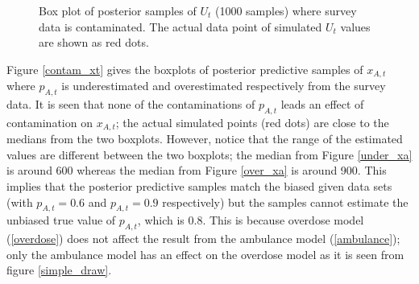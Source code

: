 \documentclass[12pt]{article}
\begin{document}
{\begin{figure}[htb]
	\centering
	\caption[Initial result: boxplot of posterior samples of $U_t$]{Box plot of posterior samples of $U_t$ (1000 samples) where survey data is contaminated.  The actual data point of simulated $U_t$ values are shown as red dots.}
	\label{contam_ut}
\end{figure}

Figure \ref{contam_xt}  gives the boxplots of posterior predictive samples of $x_{A,t}$ where $p_{A,t}$ is underestimated and overestimated respectively from the survey data. It is seen that none of the contaminations of $p_{A,t}$ leads an effect of contamination on $x_{A,t}$; the actual simulated points (red dots) are close to the medians from the two boxplots. However, notice that the range of the estimated values are different between the two boxplots; the median from Figure \ref{under_xa} is around 600 whereas the median from Figure \ref{over_xa} is around 900. This implies that the posterior predictive samples match the biased given data sets (with $p_{A,t}=0.6$ and $p_{A,t}=0.9$ respectively) but the samples cannot estimate the unbiased true value of $p_{A,t}$, which is 0.8. This is because overdose model (\ref{overdose}) does not affect the result from the ambulance model (\ref{ambulance}); only the ambulance model has an effect on the overdose model as it is seen from figure \ref{simple_draw}.

}
\end{document}

